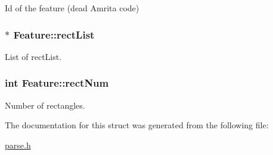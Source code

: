 Id of the feature (dead Amrita code) 

\hypertarget{structFeature_a938970b1469dcb2555a05ef73d8639d2}{}
\subsubsection[{rect\+List}]{$\ast$ Feature\+::rect\+List}\label{structFeature_a938970b1469dcb2555a05ef73d8639d2}


List of rect\+List. 

\hypertarget{structFeature_a7782b5439d41c7ba5cd5dbb83dad1285}{}
\subsubsection[{rect\+Num}]{\setlength{\rightskip}{0pt plus 5cm}int Feature\+::rect\+Num}\label{structFeature_a7782b5439d41c7ba5cd5dbb83dad1285}


Number of rectangles. 



The documentation for this struct was generated from the following file\+:\begin{DoxyCompactItemize}
\item 
\hyperlink{parse_8h}{parse.\+h}\end{DoxyCompactItemize}
